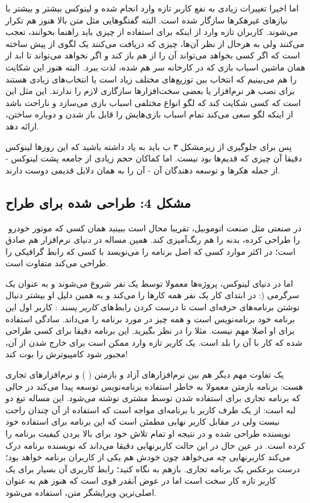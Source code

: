 اما اخیرا تغییرات زیادی به نفع کاربر تازه وارد انجام شده و لینوکس بیشتر و بیشتر با نیازهای غیرهکرها سازگار شده است. البته گفتگوهایی مثل متن بالا هنوز هم تکرار می‌شوند. کاربران تازه وارد از اینکه برای استفاده از چیزی باید راهنما بخوانند، تعجب می‌کنند ولی به هرحال از نظر آن‌ها، چیزی که دریافت می‌کنند یک لگوی از پیش ساخته است که اگر کسی بخواهد می‌تواند آن را از هم باز کند و اگر نخواهد می‌تواند تا ابد از همان ماشین اسباب بازی که در کارخانه سر هم شده، لذت ببرد. البته هنوز این شکایت را هم می‌بینیم که انتخاب بین توزیع‌های مختلف زیاد است یا انتخاب‌های زیادی هستند برای نصب هر نرم‌افزار یا بعضی سخت‌افزارها سازگاری لازم را ندارند. این مثل این است که کسی شکایت کند که لگو انواع مختلفی اسباب بازی می‌سازد و ناراحت باشد از اینکه لگو سعی می‌کند تمام اسباب بازی‌هایش را قابل باز شدن و دوباره ساختن، ارائه دهد.

پس برای جلوگیری از زیرمشکل ۳ ب باید به یاد داشته باشید که این روزها لینوکس دقیقا آن چیزی که قدیم‌ها بود نیست. اما کماکان حجم زیادی از جامعه پشت لینوکس - از جمله هکرها و توسعه دهندگان آن - آن را به همان دلایل قدیمی دوست دارند.

\subsection*{مشکل 4: طراحی شده برای طراح}
‌
در صنعتی مثل صنعت اتوموبیل، تقریبا محال است ببینید همان کسی که موتور خودرو را طراحی کرده، بدنه را هم رنگ‌آمیزی کند. همین مساله در دنیای نرم‌افزار هم صادق است؛ در اکثر موارد کسی که اصل برنامه را می‌نویسد با کسی که رابط گرافیکی را طراحی می‌کند متفاوت است.

اما در دنیای لینوکس، پروژه‌ها معمولا توسط یک نفر شروع می‌شوند و به عنوان یک سرگرمی (: در ابتدای کار یک نفر همه کارها را می‌کند و به همین دلیل او بیشتر دنبال نوشتن برنامه‌های حرفه‌ای است تا درست کردن رابط‌های
\emph{کاربر پسند}
: کاربر اول این برنامه خود برنامه‌نویس است و همه چیز در مورد برنامه را می‌داند. سادگی استفاده برای او اصلا مهم نیست. مثلا 
را در نظر بگیرید. این برنامه دقیقا برای کسی طراحی شده که کار با آن را بلد است. یک کاربر تازه وارد ممکن است برای خارج شدن از آن، مجبور شود کامپیوترش را بوت کند!

یک تفاوت مهم دیگر هم بین نرم‌افزارهای آزاد و بازمتن (
) و نرم‌افزارهای تجاری هست: برنامه بازمتن معمولا به خاطر استفاده برنامه‌نویس توسعه پیدا می‌کند در حالی که برنامه تجاری برای استفاده شدن توسط مشتری نوشته می‌شود. این مساله تیغ دو لبه است: از یک طرف کاربر با برنامه‌ای مواجه است که استفاده از آن چندان راحت نیست ولی در مقابل کاربر نهایی مطمئن است که این برنامه برای استفاده خود نویسنده طراحی شده و در نتیجه او تمام تلاش خود برای بالا بردن کیفیت برنامه را کرده است. در عین حال در این حالت کاربرنهایی دقیقا می‌داند که نویسنده برنامه درک می‌کند کاربرنهایی چه می‌خواهد چون خودش هم یکی از کاربران برنامه خواهد بود؛ درست برعکس یک برنامه تجاری.
بازهم به 
نگاه کنید؛ رابط کاربری آن بسیار برای یک کاربر تازه کار سخت است اما در عوض آنقدر قوی است که هنوز هم به عنوان اصلی‌ترین ویرایشگر متن، استفاده می‌شود.

